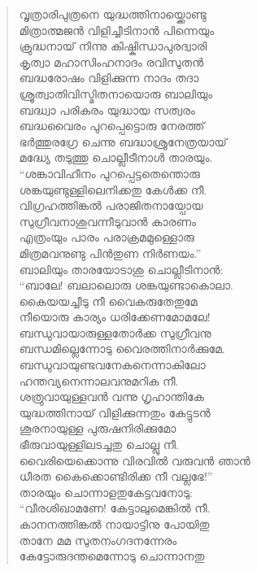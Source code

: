 \begin{verse}
വൃത്രാരിപുത്രനെ യുദ്ധത്തിനായ്ക്കൊണ്ടു\\
മിത്രാത്മജന്‍ വിളിച്ചീടിനാന്‍ പിന്നെയും\\
ക്രുദ്ധനായ് നിന്നു കിഷ്കിന്ധാപുരദ്വാരി\\
കൃത്വാ മഹാസിംഹനാദം രവിസുതന്‍\\
ബദ്ധരോഷം വിളിക്കുന്ന നാദം തദാ\\
ശ്രൂത്വാതിവിസ്മിതനായൊരു ബാലിയും\\
ബദ്ധ്വാ പരികരം യുദ്ധായ സത്വരം\\
ബദ്ധവൈരം പുറപ്പെട്ടൊരു നേരത്ത്\\
ഭര്‍ത്തുരഗ്രേ ചെന്നു ബദ്ധാശ്രുനേത്രയായ്\\
മദ്ധ്യേ തടുത്തു ചൊല്ലീടീനാള്‍ താരയും.\\
“ശങ്കാവിഹീനം പുറപ്പെട്ടതെന്തൊരു\\
ശങ്കയുണ്ടുള്ളിലെനിക്കതു കേള്‍ക്ക നീ.\\
വിഗ്രഹത്തിങ്കല്‍ പരാജിതനായ്പോയ\\
സുഗ്രീവനാശുവന്നീടുവാന്‍ കാരണം\\
എത്രംയും പാരം പരാക്രമമുള്ളൊരു\\
മിത്രമവനുണ്ടു പിന്‍തുണ നിര്‍ണയം.”\\
ബാലിയും താരയോടാശു ചൊല്ലീടിനാന്‍:\\
“ബാലേ! ബലാലൊരു ശങ്കയുണ്ടാകൊലാ.\\
കൈയയച്ചീടു നീ വൈകരുതേതുമേ\\
നീയൊരു കാര്യം ധരിക്കേണമോമലേ!\\
ബന്ധുവായാരുള്ളതോര്‍ക്ക സുഗ്രീവനു\\
ബന്ധമില്ലെന്നോടു വൈരത്തിനാര്‍ക്കുമേ.\\
ബന്ധുവായുണ്ടവനേകനെന്നാകിലോ\\
ഹന്തവ്യനെന്നാലവനുമറിക നീ.\\
ശത്രുവായുള്ളവന്‍ വന്നു ഗൃഹാന്തികേ\\
യുദ്ധത്തിനായ് വിളിക്കുന്നതും കേട്ടുടന്‍\\
ശൂരനായുള്ള പുരുഷനിരിക്കുമോ\\
ഭീരുവായുള്ളിലടച്ചതു ചൊല്ലു നീ.\\
വൈരിയെക്കൊന്നു വിരവില്‍ വരുവന്‍ ഞാന്‍\\
ധീരത കൈക്കൊണ്ടിരിക്ക നീ വല്ലഭേ!”\\
താരയും ചൊന്നാളതുകേട്ടവനോടു:\\
“വീരശിഖാമണേ! കേട്ടാലുമെങ്കില്‍ നീ.\\
കാനനത്തിങ്കല്‍ നായാട്ടിനു പോയിതു\\
താനേ മമ സുതനംഗദനന്നേരം\\
കേട്ടോരുദന്തമെന്നോടു ചൊന്നാനതു\\

\end{verse}
